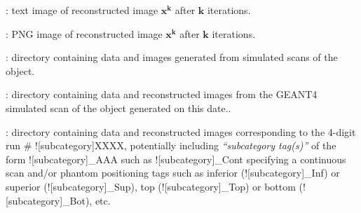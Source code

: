 \begin{tcbenvironment}
\begin{tcbparagraph}
\begin{ThinEnum}
\begin{ThinEnum}
\begin{ThinEnum}
\begin{ThinEnum}
\begin{ThinEnum}
\begin{ThinEnum}
\begin{ThinEnum}
\begin{ThinEnum}
\begin{ThinEnum}
\begin{ThinEnum}
                                                \begin{ThinEnum}
                                                    \item {} : text image of reconstructed image $\boldsymbol{x^k}$ after $\boldsymbol{k}$ iterations.
                                                    \item {} : PNG image of reconstructed image $\boldsymbol{x^k}$ after $\boldsymbol{k}$ iterations.
                                                \end{ThinEnum}
                                        \end{ThinEnum}
                                    \end{ThinEnum}
                                \end{ThinEnum}
                            \end{ThinEnum}
                        \end{ThinEnum}
                    \end{ThinEnum}
                \end{ThinEnum}
            \end{ThinEnum}
            \item {} : directory containing data and images generated from simulated scans of the object.
            \begin{ThinEnum}
                \item {} : directory containing data and reconstructed images from the GEANT4 simulated scan of the object generated on this date..
\newpage
                \begin{ThinEnum}
                    \item {} : directory containing data and reconstructed images corresponding to the 4-digit run \# \docentry![subcategory]{XXXX}, potentially including \emph{``subcategory tag(s)''} of the form \docentry![subcategory]{\_AAA} such as  \docentry![subcategory]{\_Cont} specifying a continuous scan and/or phantom positioning tags such as inferior (\docentry![subcategory]{\_Inf}) or superior (\docentry![subcategory]{\_Sup}), top (\docentry![subcategory]{\_Top}) or bottom (\docentry![subcategory]{\_Bot}), etc.

\end{ThinEnum}
\end{ThinEnum}
\end{ThinEnum}
\end{ThinEnum}
\end{tcbparagraph}
\end{tcbenvironment}
